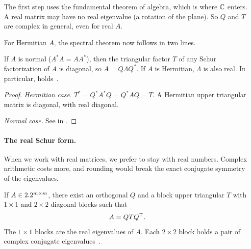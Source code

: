 The first step uses the fundamental theorem of algebra, which is where $\mathbb{C}$ enters. A real matrix may have no real eigenvalue (a rotation of the plane). So $Q$ and $T$ are complex in general, even for real $A$.

For Hermitian $A$, the spectral theorem now follows in two lines.

\begin{corollary}
  \label{cor:spectral}
  If $A$ is normal ($A^\ast A = AA^\ast$), then the triangular factor $T$ of any Schur factorization of $A$ is diagonal, so $A = Q\Lambda Q^\ast$. If $A$ is Hermitian, $\Lambda$ is also real. In particular,  holds~\cite[Thm.~24.8]{TB}.
\end{corollary}

\begin{proof}
  \emph{Hermitian case.} $T^\ast = Q^\ast A^\ast Q = Q^\ast AQ = T$. A Hermitian upper triangular matrix is diagonal, with real diagonal.

  \emph{Normal case.} See  in .
\end{proof}

\paragraph{The real Schur form.}

When we work with real matrices, we prefer to stay with real numbers. Complex arithmetic costs more, and rounding would break the exact conjugate symmetry of the eigenvalues.

\begin{theorem}
  \label{thm:real-schur}
  If $A \in 2.2^{m \times m}$, there exist an orthogonal $Q$ and a block upper triangular $T$ with $1 \times 1$ and $2 \times 2$ diagonal blocks such that
  \begin{equation}
    A = QTQ^\top.
  \end{equation}
  The $1 \times 1$ blocks are the real eigenvalues of $A$. Each $2 \times 2$ block holds a pair of complex conjugate eigenvalues~\cite[Thm.~4.3]{Demmel}.
\end{theorem}

